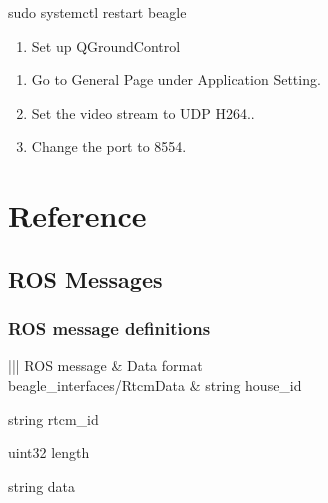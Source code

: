 \documentclass[letterpaper,10pt,english]{sphinxmanual}
\begin{document}
\begin{sphinxVerbatim}[commandchars=\\\{\}]
sudo systemctl restart beagle
\end{sphinxVerbatim}
\begin{enumerate}
%
\setcounter{enumi}{1}
\item {} 
Set up QGroundControl

\end{enumerate}
\begin{enumerate}
%
\item {} 
Go to General Page under Application Setting.

\item {} 
Set the video stream to UDP H264..

\item {} 
Change the port to 8554.

\end{enumerate}


\chapter{Reference}
\label{\detokenize{source/reference:reference}}\label{\detokenize{source/reference::doc}}
\begin{landscape}


\section{ROS Messages}
\label{\detokenize{source/ros_messages:ros-messages}}\label{\detokenize{source/ros_messages::doc}}

\subsection{ROS message definitions}
\label{\detokenize{source/ros_messages:ros-message-definitions}}

\begin{savenotes}\sphinxattablestart
\centering
{}
\sphinxthecaptionisattop
{}\label{\detokenize{source/ros_messages:id1}}
\sphinxaftertopcaption
\begin{tabular}[t]{|||}
\hline
\sphinxstyletheadfamily 
ROS message
&\sphinxstyletheadfamily 
Data format
\\
\hline
beagle\_interfaces/RtcmData
&\label{\detokenize{source/ros_messages:beagle-interfaces-msg-rtcmdata}}
string house\_id

string rtcm\_id

uint32 length

string data
\\
\hline
\end{tabular}
\par
\sphinxattableend\end{savenotes}

\end{landscape}
\end{document}
